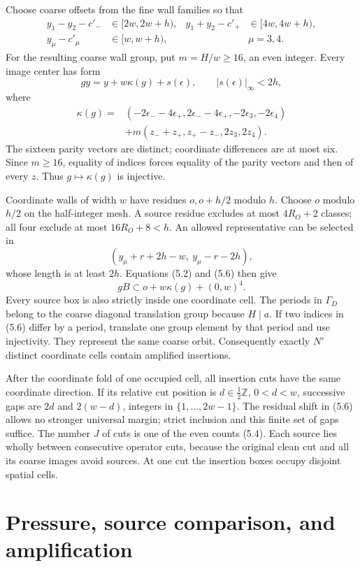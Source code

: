 \documentclass[11pt]{article}
\theoremstyle{remark}
\newcommand{\Z}{\mathbb Z}
\begin{document}
Choose coarse offsets from the fine wall families so that
\[
 \begin{aligned}
 y_1-y_2-c'_-&\in[2w,2w+h),&
 y_1+y_2-c'_+&\in[4w,4w+h),\\
 y_\mu-c'_\mu&\in[w,w+h),&&\mu=3,4.
 \end{aligned}
\]
For the resulting coarse wall group, put $m=H/w\ge16$, an even
integer. Every image center has form
\[
 gy=y+w\kappa(g)+s(\epsilon),\qquad |s(\epsilon)|_\infty<2h,
\]
where
\[
 \begin{split}
 \kappa(g)={}&(-2\epsilon_--4\epsilon_+,
               2\epsilon_--4\epsilon_+,-2\epsilon_3,-2\epsilon_4)\\
 &+m(z_-+z_+,z_+-z_-,2z_3,2z_4).
 \end{split}
 \tag{5.6}
\]
The sixteen parity vectors are distinct; coordinate differences
are at most six. Since $m\ge16$, equality of indices forces equality
of the parity vectors and then of every $z$. Thus $g\mapsto\kappa(g)$
is injective.

Coordinate walls of width $w$ have residues $o,o+h/2$ modulo $h$.
Choose $o$ modulo $h/2$ on the half-integer mesh. A source residue
excludes at most $4R_O+2$ classes; all four exclude at most
$16R_O+8<h$. An allowed representative can be selected in
\[
 (y_\mu+r+2h-w,\ y_\mu-r-2h),
\]
whose length is at least $2h$. Equations (5.2) and (5.6) then give
\[
 gB\subset o+w\kappa(g)+(0,w)^4.
 \tag{5.7}
\]
Every source box is also strictly inside one coordinate cell.
The periods in $\Gamma_D$ belong to the coarse diagonal translation
group because $H\mid a$. If two indices in (5.6) differ by a
period, translate one group element by that period and use
injectivity. They represent the same coarse orbit. Consequently
exactly $N'$ distinct coordinate cells contain amplified insertions.

After the coordinate fold of one occupied cell, all insertion cuts
have the same coordinate direction. If its relative cut position is
$d\in\tfrac12\Z$, $0<d<w$, successive gaps are $2d$ and
$2(w-d)$, integers in $\{1,\ldots,2w-1\}$.
The residual shift in (5.6) allows no stronger universal margin;
strict inclusion and this finite set of gaps suffice.
The number $J$ of cuts is one of the even counts (5.4).
Each source lies wholly between consecutive operator cuts, because
the original clean cut and all its coarse images avoid sources.
At one cut the insertion boxes occupy disjoint spatial cells.

\section{Pressure, source comparison, and amplification}
\end{document}
